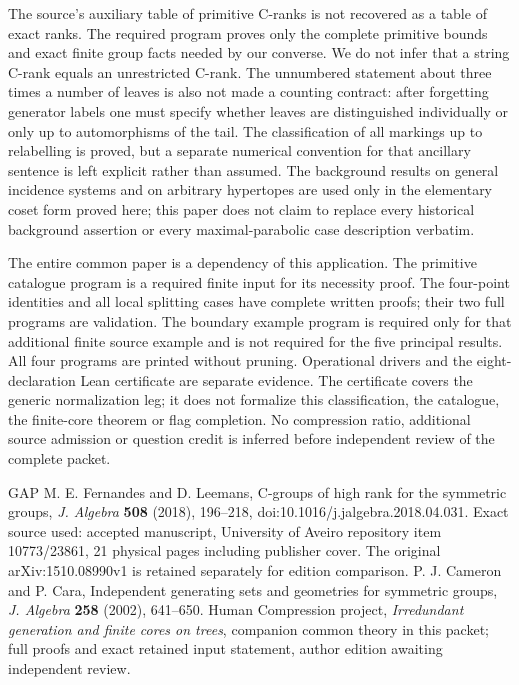 The source's auxiliary table of primitive C-ranks is not recovered as
a table of exact ranks. The required program proves only the complete
primitive bounds and exact finite group facts needed by our converse.
We do not infer that a string C-rank equals an unrestricted C-rank.
The unnumbered statement about three times a number of leaves is also
not made a counting contract: after forgetting generator labels one
must specify whether leaves are distinguished individually or only
up to automorphisms of the tail. The classification of all markings
up to relabelling is proved, but a separate numerical convention for
that ancillary sentence is left explicit rather than assumed.
The background results on general incidence systems and on arbitrary
hypertopes are used only in the elementary coset form proved here;
this paper does not claim to replace every historical background
assertion or every maximal-parabolic case description verbatim.

The entire common paper is a dependency of this application. The
primitive catalogue program is a required finite input for its
necessity proof. The four-point identities and all local splitting
cases have complete written proofs; their two full programs are
validation. The boundary example program is required only for that
additional finite source example and is not required for the five
principal results. All four programs are printed without pruning.
Operational drivers and the eight-declaration Lean certificate are
separate evidence. The certificate covers the generic normalization
leg; it does not formalize this classification, the catalogue, the
finite-core theorem or flag completion. No compression ratio, additional
source admission or question credit is inferred before independent
review of the complete packet.

\begin{thebibliography}{GAP}
 M. E. Fernandes and D. Leemans,
C-groups of high rank for the symmetric groups,
\emph{J. Algebra} \textbf{508} (2018), 196--218,
doi:10.1016/j.jalgebra.2018.04.031. Exact source used:
accepted manuscript, University of Aveiro repository item 10773/23861,
21 physical pages including publisher cover. The original
arXiv:1510.08990v1 is retained separately for edition comparison.
 P. J. Cameron and P. Cara,
Independent generating sets and geometries for symmetric groups,
\emph{J. Algebra} \textbf{258} (2002), 641--650.
 Human Compression project,
\emph{Irredundant generation and finite cores on trees},
companion common theory in this packet; full proofs and exact retained
input statement, author edition awaiting independent review.
\end{thebibliography}

